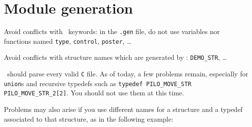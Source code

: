 %
%
%
%
%
%

\section{Module generation}

Avoid conflicts with \GenoM\ keywords: in the \texttt{.gen} file, do not use
variables nor functions named \texttt{type}, \texttt{control}, \texttt{poster},
\ldots

Avoid conflicts with structure names which are generated by \GenoM: 
\texttt{DEMO\_STR}, \ldots

\GenoM\ should parse every valid \texttt{C} file. As of today, a few
problems remain, especially for \texttt{union}s and  recursive typedefs such as
\texttt{typedef  PILO\_MOVE\_STR PILO\_MOVE\_STR\_2[2]}.  You should not use
them at this time.

Problems may also arise if you use different names for  a structure and a
typedef associated to that structure, as in the following example:

